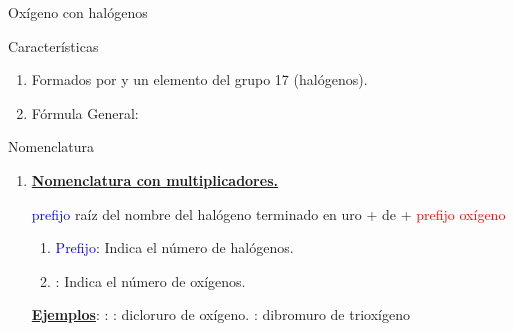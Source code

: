\documentclass{beamer}
\newcommand*{\numberballmDarkTeal}{\protect\cnumero{\arabic*}{mDarkTeal}}
\begin{document}
\begin{frame}[t]{Oxígeno con halógenos}\vspace{10pt}
    \begin{block}{\Large Características}
        \begin{enumerate}[label=\numberballmDarkTeal]
            \item Formados por  y un elemento del grupo 17 (\alert{halógenos}).
            \item Fórmula General: 
        \end{enumerate}
    \end{block}
    \begin{alertblock}{\Large Nomenclatura}
        \begin{enumerate}[label=\itembolascolor{\arabic*}{mDarkTeal}]
            \item \textbf{\uline{Nomenclatura con multiplicadores.}}
                  \begin{center}
                      \textcolor{blue}{prefijo} \textcolor{azulF}{raíz del nombre del halógeno} terminado en \textcolor{green!50!black}{uro} + de + \textcolor{red}{prefijo} \textcolor{red}{oxígeno}
                  \end{center}

                  \begin{enumerate}[label=\textcolor{red}{$\bullet$}]
                      \item \textcolor{blue}{Prefijo}: Indica el número de halógenos.
                      \item {}: Indica el número de oxígenos.
                  \end{enumerate}

                  \textbf{\uline{Ejemplos}}:  : : dicloruro de oxígeno.
                   :  dibromuro de trioxígeno
        \end{enumerate}
    \end{alertblock}
\end{frame}
\end{document}
